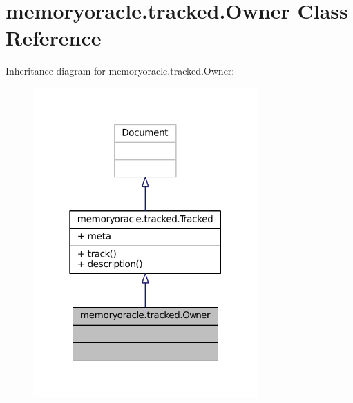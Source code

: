 \hypertarget{classmemoryoracle_1_1tracked_1_1Owner}{}\section{memoryoracle.\+tracked.\+Owner Class Reference}
\label{classmemoryoracle_1_1tracked_1_1Owner}


Inheritance diagram for memoryoracle.\+tracked.\+Owner\+:
\nopagebreak
\begin{figure}[H]
\begin{center}
\leavevmode
\includegraphics[width=244pt]{classmemoryoracle_1_1tracked_1_1Owner__inherit__graph}
\end{center}
\end{figure}


